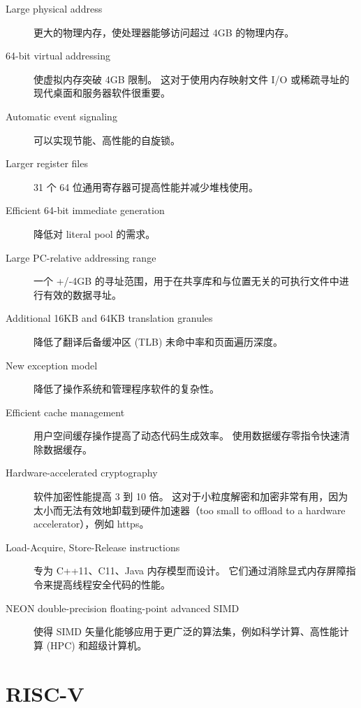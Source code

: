 \begin{description}
    \item[Large physical address] 更大的物理内存，使处理器能够访问超过 4GB 的物理内存。
    \item[64-bit virtual addressing] 使虚拟内存突破 4GB 限制。
    这对于使用内存映射文件 I/O 或稀疏寻址的现代桌面和服务器软件很重要。
    \item[Automatic event signaling] 可以实现节能、高性能的自旋锁。
    \item[Larger register files] 31 个 64 位通用寄存器可提高性能并减少堆栈使用。
    \item[Efficient 64-bit immediate generation] 降低对 literal pool 的需求。
    \item[Large PC-relative addressing range] 一个 +/‑4GB 的寻址范围，用于在共享库和与位置无关的可执行文件中进行有效的数据寻址。
    \item[Additional 16KB and 64KB translation granules] 降低了翻译后备缓冲区 (TLB) 未命中率和页面遍历深度。
    \item[New exception model] 降低了操作系统和管理程序软件的复杂性。
    \item[Efficient cache management] 用户空间缓存操作提高了动态代码生成效率。
    使用数据缓存零指令快速清除数据缓存。
    \item[Hardware-accelerated cryptography] 软件加密性能提高 3 到 10 倍。
      这对于小粒度解密和加密非常有用，因为太小而无法有效地卸载到硬件加速器（too small to offload to a hardware accelerator），例如 https。
    \item[Load-Acquire, Store-Release instructions] 专为 C++11、C11、Java 内存模型而设计。
    它们通过消除显式内存屏障指令来提高线程安全代码的性能。
    \item[NEON double-precision floating-point advanced SIMD] 使得 SIMD 矢量化能够应用于更广泛的算法集，例如科学计算、高性能计算 (HPC) 和超级计算机。
\end{description}



















\section{RISC-V}

